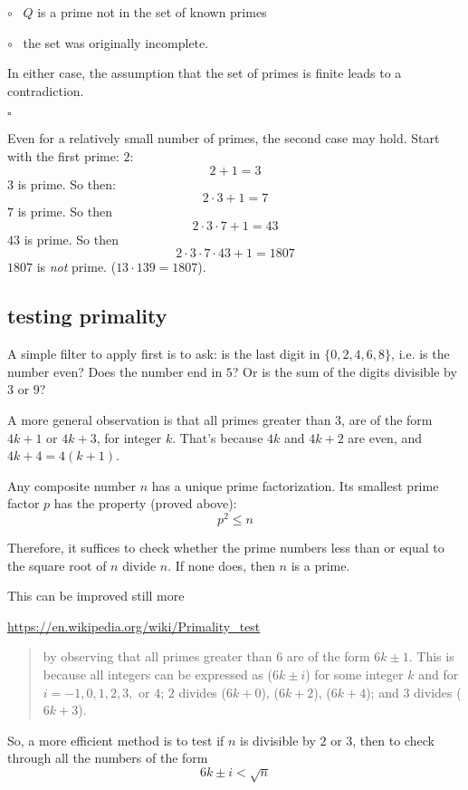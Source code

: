 \documentclass[11pt, oneside]{article}
\begin{document}
$\circ$ \  $Q$ is a prime not in the set of known primes

$\circ$ \ the set was originally incomplete.

In either case, the assumption that the set of primes is finite leads to a contradiction.

$\square$

Even for a relatively small number of primes, the second case may hold.  Start with the first prime:  $2$:
\[ 2 + 1 = 3 \]
$3$ is prime.  So then:
\[ 2 \cdot 3 + 1 = 7 \]
$7$ is prime.  So then
\[ 2 \cdot 3 \cdot 7 +1 = 43 \]
$43$ is prime.  So then
\[ 2 \cdot 3 \cdot 7 \cdot 43 + 1 =  1807 \]
$1807$ is \emph{not} prime.  ($13 \cdot 139 = 1807$).

\subsection*{testing primality}

A simple filter to apply first is to ask:  is the last digit in $\{ 0,2,4,6,8 \}$, i.e. is the number even?  Does the number end in $5$?  Or is the sum of the digits divisible by $3$ or $9$?

A more general observation is that all primes greater than $3$, are of the form $4k + 1$ or $4k + 3$, for integer $k$.  That's because $4k$ and $4k + 2$ are even, and $4k + 4 = 4(k + 1)$.

Any composite number $n$ has a unique prime factorization.  Its smallest prime factor $p$ has the property (proved above):
\[ p^2 \le n \]

Therefore, it suffices to check whether the prime numbers less than or equal to the square root of $n$ divide $n$.  If none does, then $n$ is a prime.

This can be improved still more

\url{https://en.wikipedia.org/wiki/Primality_test}

\begin{quote}by observing that all primes greater than $6$ are of the form $6k \pm 1$. This is because all integers can be expressed as ($6k \pm i$) for some integer $k$ and for $i = -1, 0, 1, 2, 3,$ or $4$; $2$ divides ($6k + 0$), ($6k + 2$), ($6k + 4$); and $3$ divides ($6k + 3$).\end{quote}

So, a more efficient method is to test if $n$ is divisible by $2$ or $3$, then to check through all the numbers of the form 
\[ 6k \pm i < \sqrt{n} \]
\end{document}
